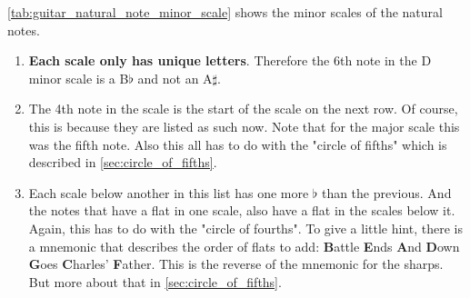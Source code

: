 \autoref{tab:guitar_natural_note_minor_scale} shows the minor scales of the natural notes.

\begin{enumerate}
	\item \textbf{Each scale only has unique letters}. Therefore the 6th note in the D minor scale is a B$\flat$ and not an A$\sharp$.
	\item The 4th note in the scale is the start of the scale on the next row. Of course, this is because they are listed as such now. Note that for the major scale this was the fifth note. Also this all has to do with the "circle of fifths" which is described in \autoref{sec:circle_of_fifths}.
	\item Each scale below another in this list has one more $\flat$ than the previous. And the notes that have a flat in one scale, also have a flat in the scales below it. Again, this has to do with the "circle of fourths". To give a little hint, there is a mnemonic that describes the order of flats to add: \textbf{B}attle \textbf{E}nds \textbf{A}nd \textbf{D}own \textbf{G}oes \textbf{C}harles' \textbf{F}ather. This is the reverse of the mnemonic for the sharps. But more about that in \autoref{sec:circle_of_fifths}.
\end{enumerate}

